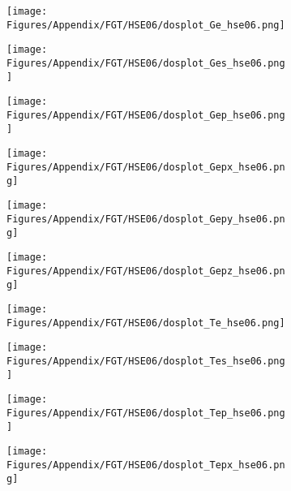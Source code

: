 \begin{figure}[H]
\begin{subfigure}{0.24\textwidth}
\end{subfigure}
\hfill
\begin{subfigure}{0.24\textwidth}
    \texttt{[image: Figures/Appendix/FGT/HSE06/dosplot\_Ge\_hse06.png]}
    \label{dosplot_FeGe_hse06}
\end{subfigure}
\hfill
\begin{subfigure}{0.24\textwidth}
    \texttt{[image: Figures/Appendix/FGT/HSE06/dosplot\_Ges\_hse06.png]}
    \label{dosplot_FeGes_hse06}
\end{subfigure}
\hfill
\begin{subfigure}{0.24\textwidth}
    \texttt{[image: Figures/Appendix/FGT/HSE06/dosplot\_Gep\_hse06.png]}
    \label{dosplot_FeGep_hse06}
\end{subfigure}
\hfill
\begin{subfigure}{0.24\textwidth}
    \texttt{[image: Figures/Appendix/FGT/HSE06/dosplot\_Gepx\_hse06.png]}
    \label{dosplot_FeGepx_hse06}
\end{subfigure}
\hfill
\begin{subfigure}{0.24\textwidth}
    \texttt{[image: Figures/Appendix/FGT/HSE06/dosplot\_Gepy\_hse06.png]}
    \label{dosplot_FeGepy_hse06}
\end{subfigure}
\hfill
\begin{subfigure}{0.24\textwidth}
    \texttt{[image: Figures/Appendix/FGT/HSE06/dosplot\_Gepz\_hse06.png]}
    \label{dosplot_FeGepz_hse06}
\end{subfigure}
\hfill
\begin{subfigure}{0.24\textwidth}
    \texttt{[image: Figures/Appendix/FGT/HSE06/dosplot\_Te\_hse06.png]}
    \label{dosplot_FeTe_hse06}
\end{subfigure}
\hfill
\begin{subfigure}{0.24\textwidth}
    \texttt{[image: Figures/Appendix/FGT/HSE06/dosplot\_Tes\_hse06.png]}
    \label{dosplot_FeTes_hse06}
\end{subfigure}
\hfill
\begin{subfigure}{0.24\textwidth}
    \texttt{[image: Figures/Appendix/FGT/HSE06/dosplot\_Tep\_hse06.png]}
    \label{dosplot_FeTep_hse06}
\end{subfigure}
\hfill
\begin{subfigure}{0.24\textwidth}
    \texttt{[image: Figures/Appendix/FGT/HSE06/dosplot\_Tepx\_hse06.png]}
    \label{dosplot_FeTepx_hse06}
\end{subfigure}

\end{figure}
